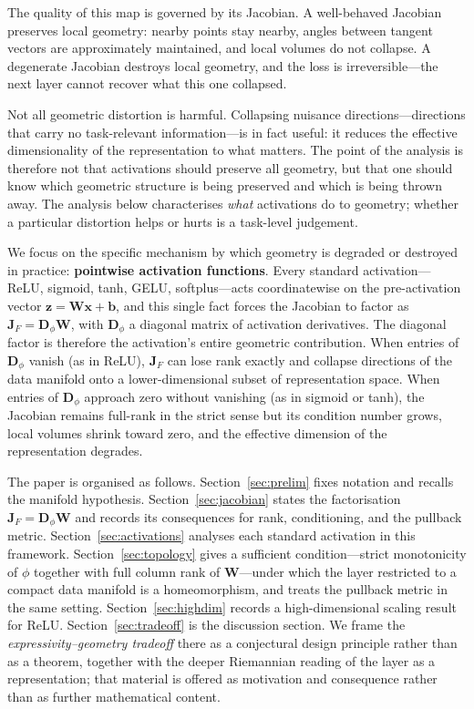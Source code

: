\documentclass[11pt,a4paper]{article}
\theoremstyle{remark}
\begin{document}
The quality of this map is governed by its Jacobian.
A well-behaved Jacobian preserves local geometry: nearby points stay nearby, angles between tangent vectors are approximately maintained, and local volumes do not collapse.
A degenerate Jacobian destroys local geometry, and the loss is irreversible---the next layer cannot recover what this one collapsed.

Not all geometric distortion is harmful.
Collapsing nuisance directions---directions that carry no task-relevant information---is in fact useful: it reduces the effective dimensionality of the representation to what matters.
The point of the analysis is therefore not that activations should preserve all geometry, but that one should know which geometric structure is being preserved and which is being thrown away.
The analysis below characterises \emph{what} activations do to geometry; whether a particular distortion helps or hurts is a task-level judgement.

We focus on the specific mechanism by which geometry is degraded or destroyed in practice: \textbf{pointwise activation functions}.
Every standard activation---ReLU, sigmoid, tanh, GELU, softplus---acts coordinatewise on the pre-activation vector $\mathbf{z} = \mathbf{W}\mathbf{x} + \mathbf{b}$, and this single fact forces the Jacobian to factor as $\mathbf{J}_F = \mathbf{D}_\phi \mathbf{W}$, with $\mathbf{D}_\phi$ a diagonal matrix of activation derivatives.
The diagonal factor is therefore the activation's entire geometric contribution.
When entries of $\mathbf{D}_\phi$ vanish (as in ReLU), $\mathbf{J}_F$ can lose rank exactly and collapse directions of the data manifold onto a lower-dimensional subset of representation space.
When entries of $\mathbf{D}_\phi$ approach zero without vanishing (as in sigmoid or tanh), the Jacobian remains full-rank in the strict sense but its condition number grows, local volumes shrink toward zero, and the effective dimension of the representation degrades.

The paper is organised as follows.
Section~\ref{sec:prelim} fixes notation and recalls the manifold hypothesis.
Section~\ref{sec:jacobian} states the factorisation $\mathbf{J}_F = \mathbf{D}_\phi \mathbf{W}$ and records its consequences for rank, conditioning, and the pullback metric.
Section~\ref{sec:activations} analyses each standard activation in this framework.
Section~\ref{sec:topology} gives a sufficient condition---strict monotonicity of $\phi$ together with full column rank of $\mathbf{W}$---under which the layer restricted to a compact data manifold is a homeomorphism, and treats the pullback metric in the same setting.
Section~\ref{sec:highdim} records a high-dimensional scaling result for ReLU.
Section~\ref{sec:tradeoff} is the discussion section.
We frame the \emph{expressivity--geometry tradeoff} there as a conjectural design principle rather than as a theorem, together with the deeper Riemannian reading of the layer as a representation; that material is offered as motivation and consequence rather than as further mathematical content.
\end{document}
